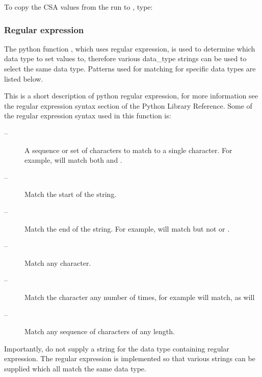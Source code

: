 To copy the CSA values from the run  to , type: 
  


  
 \subsubsection{Regular expression} 

 The python function , which uses regular expression, is used to determine which data type to set values to, therefore various data\_type strings can be used to select the same data type.  Patterns used for matching for specific data types are listed below. 
  

 This is a short description of python regular expression, for more information see the regular expression syntax section of the Python Library Reference.  Some of the regular expression syntax used in this function is: 
  

 \begin{description} 
 \item[\quotecmd{[]} --]  A sequence or set of characters to match to a single character.  For example,  will match both  and .  
 \item[\quotecmd{\^{}} --]  Match the start of the string.  
 \item[\quotecmd{\$} --]  Match the end of the string.  For example,  will match  but not  or .  
 \item[ --]  Match any character.  
 \item[ --]  Match the character  any number of times, for example  will match, as will   
 \item[ --]  Match any sequence of characters of any length.  
 \end{description} 
  

 Importantly, do not supply a string for the data type containing regular expression.  The regular expression is implemented so that various strings can be supplied which all match the same data type. 
  


